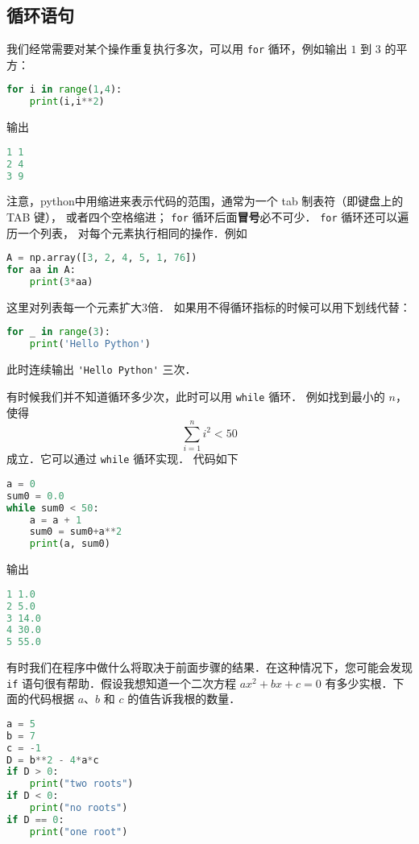 
\subsection{循环语句}
我们经常需要对某个操作重复执行多次，可以用 \verb|for| 循环，例如输出 $1$ 到 $3$ 的平方：
\begin{lstlisting}[language=python]
for i in range(1,4):
    print(i,i**2)
\end{lstlisting}
输出
\begin{lstlisting}[language=python]
1 1
2 4
3 9
\end{lstlisting}
注意，python中用缩进来表示代码的范围，通常为一个 tab 制表符（即键盘上的 TAB 键）， 或者四个空格缩进； \verb|for| 循环后面\textbf{冒号}必不可少． \verb|for| 循环还可以遍历一个列表， 对每个元素执行相同的操作．例如
\begin{lstlisting}[language=python]
A = np.array([3, 2, 4, 5, 1, 76])
for aa in A:
    print(3*aa)
\end{lstlisting}
这里对列表每一个元素扩大3倍． 如果用不得循环指标的时候可以用下划线代替：
\begin{lstlisting}[language=python]
for _ in range(3):
    print('Hello Python')
\end{lstlisting}
此时连续输出   \verb|'Hello Python'|  三次．

有时候我们并不知道循环多少次，此时可以用 \verb|while| 循环． 例如找到最小的 $n$，使得
\begin{equation}
\sum_{i=1}^n i^2<50
\end{equation}
成立．它可以通过 \verb|while| 循环实现． 代码如下
\begin{lstlisting}[language=python]
a = 0
sum0 = 0.0
while sum0 < 50:
    a = a + 1
    sum0 = sum0+a**2
    print(a, sum0)
\end{lstlisting}
输出
\begin{lstlisting}[language=python]
1 1.0
2 5.0
3 14.0
4 30.0
5 55.0
\end{lstlisting}

有时我们在程序中做什么将取决于前面步骤的结果．在这种情况下，您可能会发现 \verb|if| 语句很有帮助．假设我想知道一个二次方程 $ax^2+bx+c=0$ 有多少实根．下面的代码根据 $a$、$b$ 和 $c$ 的值告诉我根的数量．
\begin{lstlisting}[language=python]
a = 5
b = 7
c = -1 
D = b**2 - 4*a*c
if D > 0:
    print("two roots")
if D < 0:
    print("no roots")
if D == 0:
    print("one root")
\end{lstlisting}

